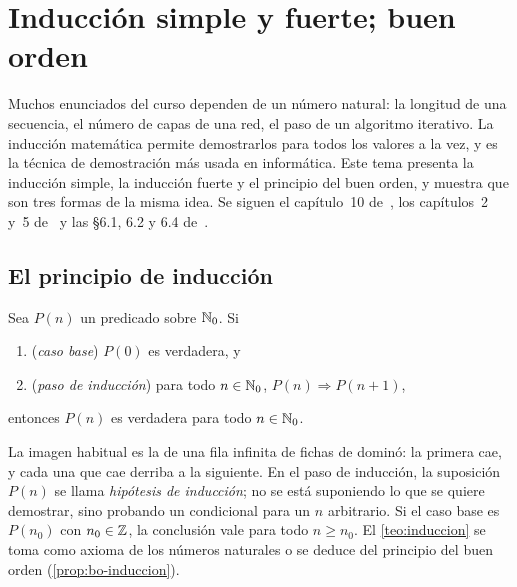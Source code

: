 \chapter{Inducción simple y fuerte; buen orden}
\label{tema:5}

Muchos enunciados del curso dependen de un número natural: la longitud de una secuencia, el número de capas de una red, el paso de un algoritmo iterativo. La inducción matemática permite demostrarlos para todos los valores a la vez, y es la técnica de demostración más usada en informática. Este tema presenta la inducción simple, la inducción fuerte y el principio del buen orden, y muestra que son tres formas de la misma idea. Se siguen el capítulo~10 de~\cite{hammack}, los capítulos~2 y~5 de~\cite{mcs} y las §6.1, 6.2 y 6.4 de~\cite{velleman}.

\section{El principio de inducción}

\begin{teorema}\label{teo:induccion}
Sea $P(n)$ un predicado sobre $\mathbb{N}_0$. Si
\begin{enumerate}
  \item (\emph{caso base}) $P(0)$ es verdadera, y
  \item (\emph{paso de inducción}) para todo $n\in\mathbb{N}_0$, $P(n)\Rightarrow P(n+1)$,
\end{enumerate}
entonces $P(n)$ es verdadera para todo $n\in\mathbb{N}_0$.
\end{teorema}

La imagen habitual es la de una fila infinita de fichas de dominó: la primera cae, y cada una que cae derriba a la siguiente. En el paso de inducción, la suposición $P(n)$ se llama \emph{hipótesis de inducción}; no se está suponiendo lo que se quiere demostrar, sino probando un condicional para un $n$ arbitrario. Si el caso base es $P(n_0)$ con $n_0\in\mathbb{Z}$, la conclusión vale para todo $n\ge n_0$. El \cref{teo:induccion} se toma como axioma de los números naturales o se deduce del principio del buen orden (\cref{prop:bo-induccion}).

\addtocounter{definicion}{1}%

\addtocounter{definicion}{1}%

\addtocounter{definicion}{1}%

